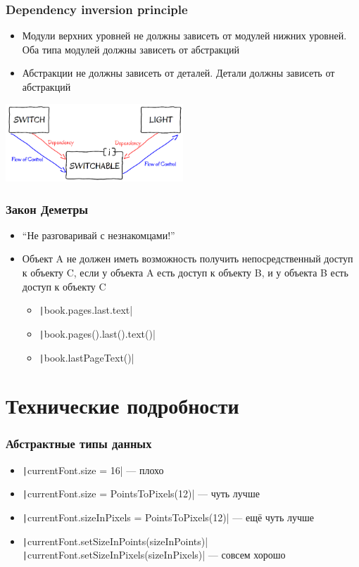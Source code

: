 \documentclass[xetex,mathserif,serif]{beamer}
\begin{document}
	\begin{frame}
		\frametitle{Dependency inversion principle}
		\begin{itemize}
			\item Модули верхних уровней не должны зависеть от модулей нижних уровней. Оба типа модулей должны зависеть от абстракций
			\item Абстракции не должны зависеть от деталей. Детали должны зависеть от абстракций
		\end{itemize}
		\begin{flushright}
			\includegraphics[width=0.5\textwidth]{dependencyInversionPrinciple.png}
		\end{flushright}
	\end{frame}

	\begin{frame}
		\frametitle{Закон Деметры}
		\begin{itemize}
			\item ``Не разговаривай с незнакомцами!''
			\item Объект A не должен иметь возможность получить непосредственный доступ к объекту C, если у объекта A есть доступ к объекту B, и у объекта B есть доступ к объекту C
			\begin{itemize}
				\item \texttt|book.pages.last.text|
				\item \texttt|book.pages().last().text()|
				\item \texttt|book.lastPageText()|
			\end{itemize}
		\end{itemize}
	\end{frame}

	\section{Технические подробности}

	\begin{frame}
		\frametitle{Абстрактные типы данных}
		\begin{itemize}
			\item \texttt|currentFont.size = 16| --- плохо
			\item \texttt|currentFont.size = PointsToPixels(12)| --- чуть лучше
			\item \texttt|currentFont.sizeInPixels = PointsToPixels(12)| --- ещё чуть лучше
			\item \texttt|currentFont.setSizeInPoints(sizeInPoints)| \newline
					\texttt|currentFont.setSizeInPixels(sizeInPixels)| --- совсем хорошо
		\end{itemize}
	\end{frame}
\end{document}

